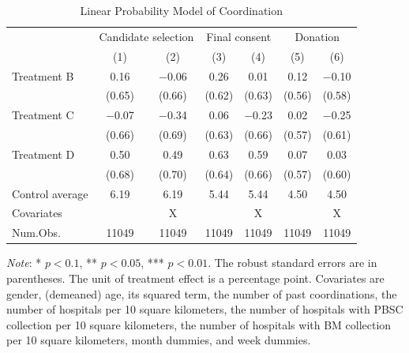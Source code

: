 \documentclass [12pt, a4paper]{article}
\begin{document}
\begin{table}[H]

\caption{\label{tab:coordinate-reg}Linear Probability Model of Coordination}
\centering
\fontsize{9}{11}\selectfont
\begin{threeparttable}
\begin{tabular}[t]{lcccccc}
\toprule
\multicolumn{1}{c}{ } & \multicolumn{2}{c}{Candidate selection} & \multicolumn{2}{c}{Final consent} & \multicolumn{2}{c}{Donation} \\
\cmidrule(l{3pt}r{3pt}){2-3} \cmidrule(l{3pt}r{3pt}){4-5} \cmidrule(l{3pt}r{3pt}){6-7}
  & (1) & (2) & (3) & (4) & (5) & (6)\\
\midrule
Treatment B & \num{0.16} & \num{-0.06} & \num{0.26} & \num{0.01} & \num{0.12} & \num{-0.10}\\
 & (\num{0.65}) & (\num{0.66}) & (\num{0.62}) & (\num{0.63}) & (\num{0.56}) & (\num{0.58})\\
Treatment C & \num{-0.07} & \num{-0.34} & \num{0.06} & \num{-0.23} & \num{0.02} & \num{-0.25}\\
 & (\num{0.66}) & (\num{0.69}) & (\num{0.63}) & (\num{0.66}) & (\num{0.57}) & (\num{0.61})\\
Treatment D & \num{0.50} & \num{0.49} & \num{0.63} & \num{0.59} & \num{0.07} & \num{0.03}\\
 & (\num{0.68}) & (\num{0.70}) & (\num{0.64}) & (\num{0.66}) & (\num{0.57}) & (\num{0.60})\\
\midrule
Control average & 6.19 & 6.19 & 5.44 & 5.44 & 4.50 & 4.50\\
Covariates &  & X &  & X &  & X\\
Num.Obs. & \num{11049} & \num{11049} & \num{11049} & \num{11049} & \num{11049} & \num{11049}\\
\bottomrule
\end{tabular}
\begin{tablenotes}
\item \emph{Note}: * $p < 0.1$, ** $p < 0.05$, *** $p < 0.01$. The robust standard errors are in parentheses. The unit of treatment effect is a percentage point. Covariates are gender, (demeaned) age, its squared term, the number of past coordinations, the number of hospitals per 10 square kilometers, the number of hospitals with PBSC collection per 10 square kilometers, the number of hospitals with BM collection per 10 square kilometers, month dummies, and week dummies.
\end{tablenotes}
\end{threeparttable}
\end{table}
\end{document}
